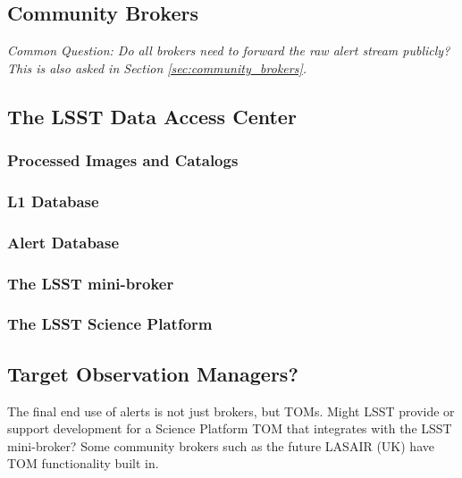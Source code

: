 \subsection{Community Brokers}

{\it Common Question: Do all brokers need to forward the raw alert stream publicly? This is also asked in Section \ref{sec:community_brokers}.}


\subsection{The LSST Data Access Center}

\subsubsection{Processed Images and Catalogs}

\subsubsection{L1 Database}

\subsubsection{Alert Database}

\subsubsection{The LSST mini-broker}

\subsubsection{The LSST Science Platform}

\subsection{Target Observation Managers?}

The final end use of alerts is not just brokers, but TOMs. Might LSST provide or support development for a Science Platform TOM that integrates with the LSST mini-broker? Some community brokers such as the future LASAIR (UK) have TOM functionality built in. 
